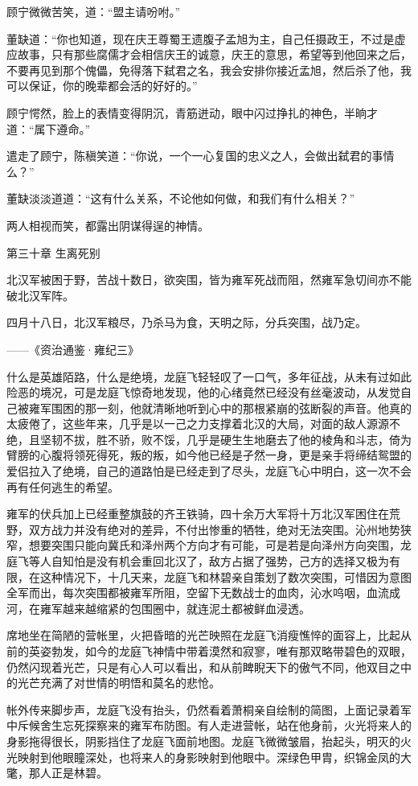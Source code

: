顾宁微微苦笑，道：“盟主请吩咐。”

董缺道：“你也知道，现在庆王尊蜀王遗腹子孟旭为主，自己任摄政王，不过是虚应故事，只有那些腐儒才会相信庆王的诚意，庆王的意思，希望等到他回来之后，不要再见到那个傀儡，免得落下弑君之名，我会安排你接近孟旭，然后杀了他，我可以保证，你的晚辈都会活的好好的。”

顾宁愕然，脸上的表情变得阴沉，青筋迸动，眼中闪过挣扎的神色，半晌才道：“属下遵命。”

遣走了顾宁，陈稹笑道：“你说，一个一心复国的忠义之人，会做出弑君的事情么？”

董缺淡淡道道：“这有什么关系，不论他如何做，和我们有什么相关？”

两人相视而笑，都露出阴谋得逞的神情。

第三十章    生离死别

北汉军被困于野，苦战十数日，欲突围，皆为雍军死战而阻，然雍军急切间亦不能破北汉军阵。

四月十八日，北汉军粮尽，乃杀马为食，天明之际，分兵突围，战乃定。

——《资治通鉴·雍纪三》

什么是英雄陌路，什么是绝境，龙庭飞轻轻叹了一口气，多年征战，从未有过如此险恶的境况，可是龙庭飞惊奇地发现，他的心绪竟然已经没有丝毫波动，从发觉自己被雍军围困的那一刻，他就清晰地听到心中的那根紧崩的弦断裂的声音。他真的太疲倦了，这些年来，几乎是以一己之力支撑着北汉的大局，对面的敌人源源不绝，且坚韧不拔，胜不骄，败不馁，几乎是硬生生地磨去了他的棱角和斗志，倚为臂膀的心腹将领死得死，叛的叛，如今他已经是孑然一身，更是亲手将缔结鸳盟的爱侣拉入了绝境，自己的道路怕是已经走到了尽头，龙庭飞心中明白，这一次不会再有任何逃生的希望。

雍军的伏兵加上已经重整旗鼓的齐王铁骑，四十余万大军将十万北汉军困住在荒野，双方战力并没有绝对的差异，不付出惨重的牺牲，绝对无法突围。沁州地势狭窄，想要突围只能向冀氏和泽州两个方向才有可能，可是若是向泽州方向突围，龙庭飞等人自知怕是没有机会重回北汉了，敌方占据了强势，己方的选择又极为有限，在这种情况下，十几天来，龙庭飞和林碧亲自策划了数次突围，可惜因为意图全军而出，每次突围都被雍军所阻，空留下无数战士的血肉，沁水呜咽，血流成河，在雍军越来越缩紧的包围圈中，就连泥土都被鲜血浸透。

席地坐在简陋的营帐里，火把昏暗的光芒映照在龙庭飞消瘦憔悴的面容上，比起从前的英姿勃发，如今的龙庭飞神情中带着漠然和寂寥，唯有那双略带碧色的双眼，仍然闪现着光芒，只是有心人可以看出，和从前睥睨天下的傲气不同，他双目之中的光芒充满了对世情的明悟和莫名的悲怆。

帐外传来脚步声，龙庭飞没有抬头，仍然看着萧桐亲自绘制的简图，上面记录着军中斥候舍生忘死探察来的雍军布防图。有人走进营帐，站在他身前，火光将来人的身影拖得很长，阴影挡住了龙庭飞面前地图。龙庭飞微微皱眉，抬起头，明灭的火光映射到他眼瞳深处，也将来人的身影映射到他眼中。深绿色甲胄，织锦金凤的大氅，那人正是林碧。

